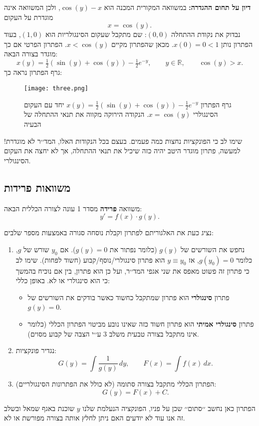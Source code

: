 \documentclass{article}
\numberwithin{equation}{section}
\begin{document}
\textbf{דיון על תחום ההגדרה:}  
במשוואה המקורית המכנה הוא $\cos(y)-x$, ולכן המשוואה אינה מוגדרת על העקום
\[
x = \cos(y).
\]
נבדוק את נקודת ההתחלה $(0,0)$: שם מתקבל שעקום הסינגולריות הוא $(1,0)$, 
בעוד הפתרון נותן $x(0)=0 < 1$.  
מכאן שהפתרון מקיים $x<\cos(y)$. הפתרון הפרטי אם כך מוגדר בצורה הבאה:
\[
\boxed{\, x(y) = \tfrac{1}{2}(\sin(y)+\cos(y)) - \tfrac{1}{2} e^{-y}, \qquad y\in\mathbb{R} ,\qquad \cos(y) > x. \,}
\]
גרף הפתרון נראה כך:
\begin{figure}[H]
    \centering
    \texttt{[image: three.png]}
    \caption{גרף הפתרון $x(y)=\tfrac{1}{2}(\sin(y)+\cos(y))-\tfrac{1}{2}e^{-y}$ 
    יחד עם העקום הסינגולרי $x=\cos(y)$. הנקודה הירוקה מקווה את תנאי ההתחלה של הבעיה}
    \label{fig:cos_case}
\end{figure}
שימו לב כי הפונקציות נחצות כמה פעמים. בעצם בכל הנקודות האלו, המד׳׳ר לא מוגדרת! למעשה, פתרון מוגדר היטב יהיה כזה שיכיל את תנאי ההתחלה, אך לא יחצה את העקום הסינגולרי.


\newpage
\subsection{משוואות פרידות}

משוואה \textbf{פרידה} מסדר 1 עונה לצורה הכללית הבאה:
\begin{equation}
y' = f(x)\cdot g(y).
\end{equation}

נציג כעת את האלגוריתם לפתרון וקבלת נוסחה סגורה באמצעות מספר שלבים:
\begin{enumerate}
  \item נחפש את השורשים של $g(y)$ (כלומר נפתור את $g(y)=0$). 
  אם $y_0$ שורש של $g$, כלומר $g(y_0)=0$, אז $y \equiv y_0$ הוא פתרון סינגולרי/נוסף/קבוע (חשוד לפחות). שימו לב כי פתרון זה פשוט מאפס את שני אגפי המד׳׳ר, ועל כן הוא פתרון, בין אם נוכיח בהמשך כי הוא סינגולרי או לא.
  באופן כללי:  
\begin{itemize}
  \item[] פתרון \textbf{ סינגולרי} הוא פתרון שמתקבל כחשוד כאשר בודקים את השורשים של $g(y)=0$.
  \item[] פתרון \textbf{סינגולרי אמיתי} הוא פתרון חשוד כזה שאינו נובע מביטוי הפתרון הכללי (כלומר אינו מתקבל בצורה טבעית משלב 3 ע׳׳י הצבה של קבוע מסוים).
\end{itemize}
  \item נגדיר פונקציות:
  \[
  G(y) = \int \frac{1}{g(y)}\,dy, 
  \qquad 
  F(x) = \int f(x)\,dx.
  \]
  \item הפתרון הכללי מתקבל בצורה סתומה (לא כולל את הפתרונות הסינגולריים):
  \begin{equation}
  G(y) = F(x) + C.
  \end{equation}
\end{enumerate}
הפתרון כאן נחשב ׳׳סתום׳׳ שכן על פניו, הפונקציה הנעלמת שלנו $y$ שוכנת באגף שמאל ובשלב זה אנו עוד לא יודעים האם ניתן לחלץ אותה בצורה מפורשת או לא. 
\vspace{0.5cm}
\end{document}
